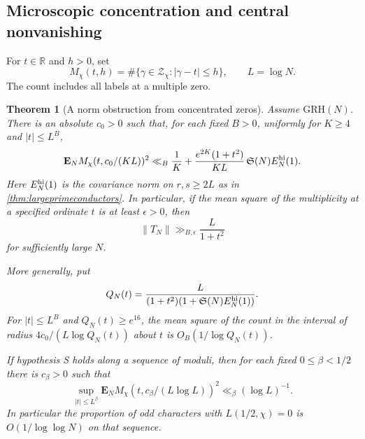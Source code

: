 \documentclass[11pt,a4paper]{article}
\numberwithin{equation}{section}
\newtheorem{theorem}{Theorem}[section]
\newcommand{\SSS}{\mathfrak S}
\newcommand{\grh}{\mathrm{GRH}}
\begin{document}
\subsection{Microscopic concentration and central nonvanishing}

For $t\in\mathbb R$ and $h>0$, set
\[
 M_\chi(t,h)=\#\{\gamma\in\mathcal Z_\chi:|\gamma-t|\le h\},
 \qquad L=\log N.
\]
The count includes all labels at a multiple zero.

\begin{theorem}[A norm obstruction from concentrated zeros]
\label{thm:microscopicconcentration}
Assume $\grh(N)$. There is an absolute $c_0>0$ such that,
for each fixed $B>0$, uniformly for $K\ge4$ and $|t|\le L^B$,
\begin{equation}
 \mathbf E_N M_\chi(t,c_0/(KL))^2
 \ll_B \frac1K
       +\frac{e^{2K}(1+t^2)}{KL}\,\SSS(N) E_N^{\rm hi}(1).
 \label{eq:microscopicconcentration}
\end{equation}
Here $E_N^{\rm hi}(1)$ is the covariance norm on
$r,s\ge2L$ as in \cref{thm:largeprimeconductors}.
In particular, if the mean square of the multiplicity
at a specified ordinate $t$ is at least $\epsilon>0$, then
\begin{equation}
 \|T_N\|\gg_{B,\epsilon}\frac{L}{1+t^2}
 \label{eq:multiplicityobstruction}
\end{equation}
for sufficiently large $N$.

More generally, put
\[
 Q_N(t)=\frac{L}
        {(1+t^2)(1+\SSS(N)E_N^{\rm hi}(1))}.
\]
For $|t|\le L^B$ and $Q_N(t)\ge e^{16}$, the mean square
of the count in the interval of radius
$4c_0/(L\log Q_N(t))$ about $t$ is $O_B(1/\log Q_N(t))$.

If hypothesis S holds along a sequence of moduli, then for
each fixed $0\le\beta<1/2$ there is $c_\beta>0$ such that
\begin{equation}
 \sup_{|t|\le L^\beta}
   \mathbf E_N M_\chi(t,c_\beta/(L\log L))^2
             \ll_\beta (\log L)^{-1}.
 \label{eq:microvanishing}
\end{equation}
In particular the proportion of odd characters with
$L(1/2,\chi)=0$ is $O(1/\log\log N)$ on that sequence.
\end{theorem}
\end{document}
